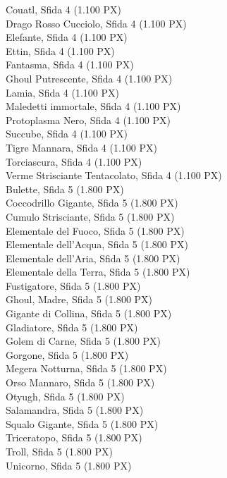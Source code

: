 \begin{multicols}{3}
{		Couatl, Sfida 4 (1.100 PX)\\
		Drago Rosso Cucciolo, Sfida 4 (1.100 PX)\\
		Elefante, Sfida 4 (1.100 PX)\\
		Ettin, Sfida 4 (1.100 PX)\\
		Fantasma, Sfida 4 (1.100 PX)\\
		Ghoul Putrescente, Sfida 4 (1.100 PX)\\
		Lamia, Sfida 4 (1.100 PX)\\
		Maledetti immortale, Sfida 4 (1.100 PX)\\
		Protoplasma Nero, Sfida 4 (1.100 PX)\\
		Succube, Sfida 4 (1.100 PX)\\
		Tigre Mannara, Sfida 4 (1.100 PX)\\
		Torciascura, Sfida 4 (1.100 PX)\\
		Verme Strisciante Tentacolato, Sfida 4 (1.100 PX)\\
		Bulette, Sfida 5 (1.800 PX)\\
		Coccodrillo Gigante, Sfida 5 (1.800 PX)\\
		Cumulo Strisciante, Sfida 5 (1.800 PX)\\
		Elementale del Fuoco, Sfida 5 (1.800 PX)\\
		Elementale dell'Acqua, Sfida 5 (1.800 PX)\\
		Elementale dell'Aria, Sfida 5 (1.800 PX)\\
		Elementale della Terra, Sfida 5 (1.800 PX)\\
		Fustigatore, Sfida 5 (1.800 PX)\\
		Ghoul, Madre, Sfida 5 (1.800 PX)\\
		Gigante di Collina, Sfida 5 (1.800 PX)\\
		Gladiatore, Sfida 5 (1.800 PX)\\
		Golem di Carne, Sfida 5 (1.800 PX)\\
		Gorgone, Sfida 5 (1.800 PX)\\
		Megera Notturna, Sfida 5 (1.800 PX)\\
		Orso Mannaro, Sfida 5 (1.800 PX)\\
		Otyugh, Sfida 5 (1.800 PX)\\
		Salamandra, Sfida 5 (1.800 PX)\\
		Squalo Gigante, Sfida 5 (1.800 PX)\\
		Triceratopo, Sfida 5 (1.800 PX)\\
		Troll, Sfida 5 (1.800 PX)\\
		Unicorno, Sfida 5 (1.800 PX)\\
}
\end{multicols}
